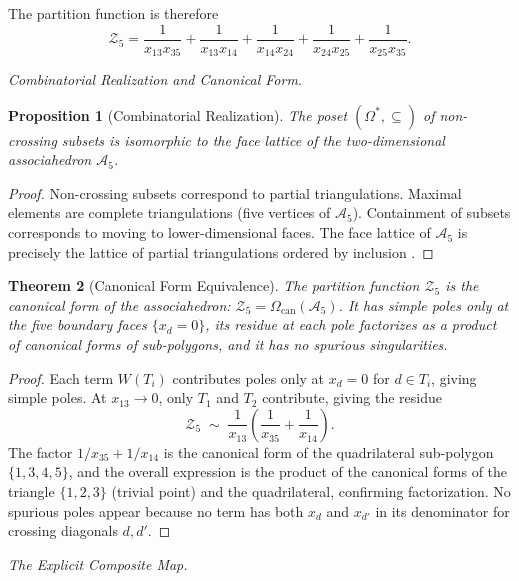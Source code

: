 \documentclass[12pt, oneside]{amsart}
\theoremstyle{plain}
\newtheorem{theorem}{Theorem}[section]
\newtheorem{proposition}[theorem]{Proposition}
\theoremstyle{definition}
\theoremstyle{remark}
\newcommand{\OmKS}{\Omega}
\begin{document}
The partition function is therefore
\begin{equation}
\label{eq:pentagon-Z}
  \mathcal{Z}_5 = \frac{1}{x_{13}x_{35}} + \frac{1}{x_{13}x_{14}} + \frac{1}{x_{14}x_{24}} + \frac{1}{x_{24}x_{25}} + \frac{1}{x_{25}x_{35}}.
\end{equation}

\medskip\noindent\textit{Combinatorial Realization and Canonical Form.}

\begin{proposition}[Combinatorial Realization]
The poset $(\OmKS^*, \subseteq)$ of non-crossing subsets is isomorphic to the face lattice of the two-dimensional associahedron $\mathcal{A}_5$.
\end{proposition}

\begin{proof}
Non-crossing subsets correspond to partial triangulations. Maximal elements are complete triangulations (five vertices of $\mathcal{A}_5$). Containment of subsets corresponds to moving to lower-dimensional faces. The face lattice of $\mathcal{A}_5$ is precisely the lattice of partial triangulations ordered by inclusion \cite{Stasheff1963}.
\end{proof}

\begin{theorem}[Canonical Form Equivalence]
The partition function $\mathcal{Z}_5$ is the canonical form of the associahedron: $\mathcal{Z}_5 = \Omega_{\mathrm{can}}(\mathcal{A}_5)$. It has simple poles only at the five boundary faces $\{x_d = 0\}$, its residue at each pole factorizes as a product of canonical forms of sub-polygons, and it has no spurious singularities.
\end{theorem}

\begin{proof}
Each term $W(T_i)$ contributes poles only at $x_d = 0$ for $d \in T_i$, giving simple poles. At $x_{13} \to 0$, only $T_1$ and $T_2$ contribute, giving the residue
\[
  \mathcal{Z}_5 \;\sim\; \frac{1}{x_{13}} \left(\frac{1}{x_{35}} + \frac{1}{x_{14}}\right).
\]
The factor $1/x_{35} + 1/x_{14}$ is the canonical form of the quadrilateral sub-polygon $\{1,3,4,5\}$, and the overall expression is the product of the canonical forms of the triangle $\{1,2,3\}$ (trivial point) and the quadrilateral, confirming factorization. No spurious poles appear because no term has both $x_d$ and $x_{d'}$ in its denominator for crossing diagonals $d, d'$.
\end{proof}

\medskip\noindent\textit{The Explicit Composite Map.}
\end{document}
